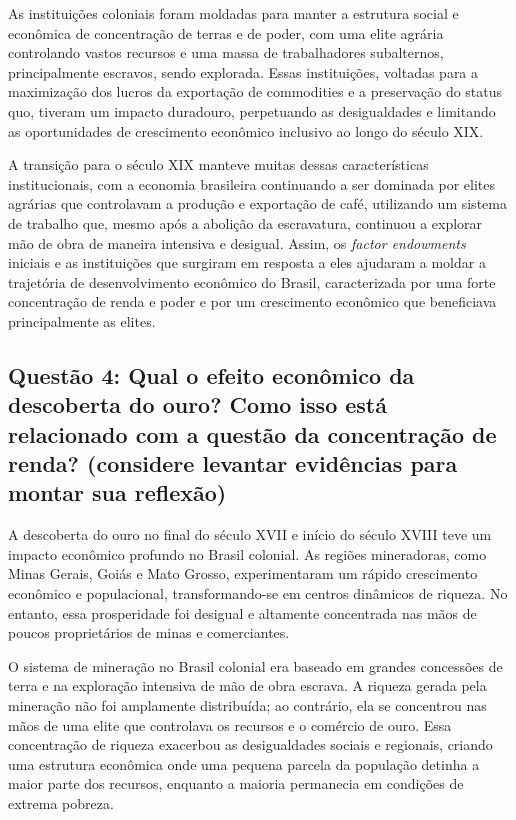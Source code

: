 \documentclass[a4paper,12pt]{article}[abntex2]
\begin{document}
As instituições coloniais foram moldadas para manter a estrutura social e econômica de concentração de terras e de poder, com uma elite agrária controlando vastos recursos e uma massa de trabalhadores subalternos, principalmente escravos, sendo explorada. Essas instituições, voltadas para a maximização dos lucros da exportação de commodities e a preservação do status quo, tiveram um impacto duradouro, perpetuando as desigualdades e limitando as oportunidades de crescimento econômico inclusivo ao longo do século XIX.

A transição para o século XIX manteve muitas dessas características institucionais, com a economia brasileira continuando a ser dominada por elites agrárias que controlavam a produção e exportação de café, utilizando um sistema de trabalho que, mesmo após a abolição da escravatura, continuou a explorar mão de obra de maneira intensiva e desigual. Assim, os \textit{factor endowments} iniciais e as instituições que surgiram em resposta a eles ajudaram a moldar a trajetória de desenvolvimento econômico do Brasil, caracterizada por uma forte concentração de renda e poder e por um crescimento econômico que beneficiava principalmente as elites.

\subsection{\textbf{Questão 4: Qual o efeito econômico da descoberta do ouro? Como isso está relacionado com a questão da concentração de renda? (considere levantar evidências para montar sua reflexão)}}

A descoberta do ouro no final do século XVII e início do século XVIII teve um impacto econômico profundo no Brasil colonial. As regiões mineradoras, como Minas Gerais, Goiás e Mato Grosso, experimentaram um rápido crescimento econômico e populacional, transformando-se em centros dinâmicos de riqueza. No entanto, essa prosperidade foi desigual e altamente concentrada nas mãos de poucos proprietários de minas e comerciantes.

O sistema de mineração no Brasil colonial era baseado em grandes concessões de terra e na exploração intensiva de mão de obra escrava. A riqueza gerada pela mineração não foi amplamente distribuída; ao contrário, ela se concentrou nas mãos de uma elite que controlava os recursos e o comércio de ouro. Essa concentração de riqueza exacerbou as desigualdades sociais e regionais, criando uma estrutura econômica onde uma pequena parcela da população detinha a maior parte dos recursos, enquanto a maioria permanecia em condições de extrema pobreza.
\end{document}
